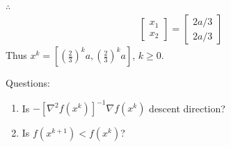 \documentclass[11pt]{article}
\numberwithin{equation}{section}
\begin{document}
\begin{example}
\begin{align*}
    \end{align*}
    $\therefore$ \begin{align*}
        \left[\begin{array}{l}
            x_{1} \\
            x_{2}
            \end{array}\right]=\left[\begin{array}{l}
            2a / 3 \\
            2a / 3
            \end{array}\right]
    \end{align*}
    Thus $x^k = \left[ (\frac{2}{3})^ka, (\frac{2}{3})^ka \right]$, $k \geq 0$.
\end{example}

Questions:\begin{enumerate}
    \item Is $-\left[\nabla^{2} f\left(x^{k}\right)\right]^{-1} \nabla f\left(x^{k}\right)$ descent direction?
    \item Is $f(x^{k+1}) < f(x^k)$?
\end{enumerate}
\end{document}
